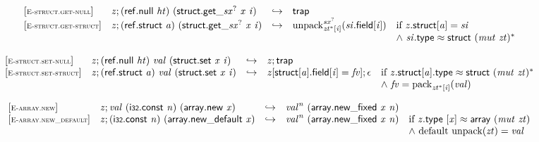 $$
\begin{array}{@{}l@{}lcl@{}l@{}}
{[\textsc{\scriptsize E{-}struct.get{-}null}]} \quad & {\mathit{z}} ; (\mathsf{ref.null}~{\mathit{ht}})~({{\mathsf{struct.get}}{\mathsf{\_}}}{{{\mathit{sx}}^?}}~{\mathit{x}}~{\mathit{i}}) &\hookrightarrow& \mathsf{trap} &  \\
{[\textsc{\scriptsize E{-}struct.get{-}struct}]} \quad & {\mathit{z}} ; (\mathsf{ref.struct}~{\mathit{a}})~({{\mathsf{struct.get}}{\mathsf{\_}}}{{{\mathit{sx}}^?}}~{\mathit{x}}~{\mathit{i}}) &\hookrightarrow& {{{{\mathrm{unpack}}}_{{{\mathit{zt}}^\ast}[{\mathit{i}}]}^{{{\mathit{sx}}^?}}}}{({\mathit{si}}.\mathsf{field}[{\mathit{i}}])} &\quad
  \mbox{if}~{\mathit{z}}.\mathsf{struct}[{\mathit{a}}] = {\mathit{si}} \\
 &&&&\quad {\land}~{\mathit{si}}.\mathsf{type} \approx \mathsf{struct}~{({\mathit{mut}}~{\mathit{zt}})^\ast} \\
\end{array}
$$

\vspace{1ex}

$$
\begin{array}{@{}l@{}lcl@{}l@{}}
{[\textsc{\scriptsize E{-}struct.set{-}null}]} \quad & {\mathit{z}} ; (\mathsf{ref.null}~{\mathit{ht}})~{\mathit{val}}~(\mathsf{struct.set}~{\mathit{x}}~{\mathit{i}}) &\hookrightarrow& {\mathit{z}} ; \mathsf{trap} &  \\
{[\textsc{\scriptsize E{-}struct.set{-}struct}]} \quad & {\mathit{z}} ; (\mathsf{ref.struct}~{\mathit{a}})~{\mathit{val}}~(\mathsf{struct.set}~{\mathit{x}}~{\mathit{i}}) &\hookrightarrow& {\mathit{z}}[\mathsf{struct}[{\mathit{a}}].\mathsf{field}[{\mathit{i}}] = {\mathit{fv}}] ; \epsilon &\quad
  \mbox{if}~{\mathit{z}}.\mathsf{struct}[{\mathit{a}}].\mathsf{type} \approx \mathsf{struct}~{({\mathit{mut}}~{\mathit{zt}})^\ast} \\
 &&&&\quad {\land}~{\mathit{fv}} = {{\mathrm{pack}}}_{{{\mathit{zt}}^\ast}[{\mathit{i}}]}({\mathit{val}}) \\
\end{array}
$$

\vspace{1ex}

$$
\begin{array}{@{}l@{}lcl@{}l@{}}
{[\textsc{\scriptsize E{-}array.new}]} \quad & {\mathit{z}} ; {\mathit{val}}~(\mathsf{i{\scriptstyle32}}.\mathsf{const}~{\mathit{n}})~(\mathsf{array.new}~{\mathit{x}}) &\hookrightarrow& {{\mathit{val}}^{{\mathit{n}}}}~(\mathsf{array.new\_fixed}~{\mathit{x}}~{\mathit{n}}) &  \\
{[\textsc{\scriptsize E{-}array.new\_default}]} \quad & {\mathit{z}} ; (\mathsf{i{\scriptstyle32}}.\mathsf{const}~{\mathit{n}})~(\mathsf{array.new\_default}~{\mathit{x}}) &\hookrightarrow& {{\mathit{val}}^{{\mathit{n}}}}~(\mathsf{array.new\_fixed}~{\mathit{x}}~{\mathit{n}}) &\quad
  \mbox{if}~{\mathit{z}}.\mathsf{type}~[{\mathit{x}}] \approx \mathsf{array}~({\mathit{mut}}~{\mathit{zt}}) \\
 &&&&\quad {\land}~{\mathrm{default}}~{\mathrm{unpack}}({\mathit{zt}}) = {\mathit{val}} \\
\end{array}
$$

